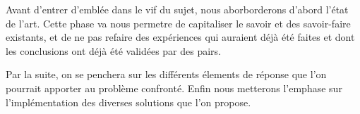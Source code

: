 Avant d'entrer d'emblée dans le vif du sujet, nous aborborderons 
d'abord l'état de l'art. Cette phase va nous permetre de capitaliser le 
savoir et des savoir-faire existants, et de ne pas refaire des expériences 
qui auraient déjà été faites et dont les conclusions ont déjà été validées 
par des pairs.
\par
Par la suite, on se penchera sur les différents élements de réponse que l'on 
pourrait apporter au problème confronté.
Enfin nous metterons l'emphase sur l'implémentation des diverses solutions 
que l'on propose.
